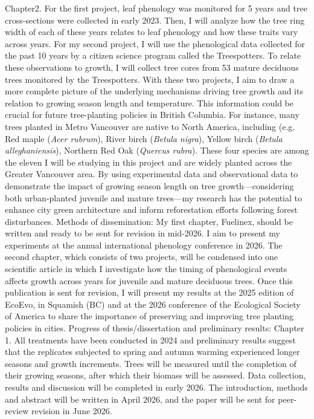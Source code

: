 \documentclass[11pt,letter]{article}
\begin{document}
Chapter2. For the first project, leaf phenology was monitored for 5 years and tree cross-sections  were collected in early 2023. Then, I will analyze how the tree ring width of each of these years relates to leaf phenology and how these traits vary across years. For my second project, I will use the phenological data collected for the past 10 years by a citizen science program called the Treespotters. To relate these observations to growth, I will collect tree cores from 53 mature deciduous trees monitored by the Treespotters. With these two projects, I aim to draw a more complete picture of the underlying mechanisms driving tree growth and its relation to growing season length and temperature. This information could be crucial for future tree-planting policies in British Columbia. For instance, many trees planted in Metro Vancouver are native to North America, including (e.g. Red maple (\textit{Acer rubrum}), River birch (\textit{Betula nigra}), Yellow birch (\textit{Betula alleghaniensis}), Northern Red Oak (\textit{Quercus rubra}). These four species are among the eleven I will be studying in this project and are widely planted across the Greater Vancouver area. By using experimental data and observational data to demonstrate the impact of growing season length on tree growth—considering both urban-planted juvenile and mature trees—my research has the potential to enhance city green architecture and inform reforestation efforts following forest disturbances.
Methods of dissemination: My first chapter, Fuelinex, should be written and ready to be sent for revision in mid-2026. I aim to present my experiments at the annual international phenology conference in 2026. The second chapter, which consists of two projects, will be condensed into one scientific article in which I investigate how the timing of phenological events affects growth across years for juvenile and mature deciduous trees. Once this publication is sent for revision, I will present my results at the 2025 edition of EcoEvo, in Squamish (BC) and at the 2026 conference of the Ecological Society of America to share the importance of preserving and improving tree planting policies in cities.
Progress of thesis/dissertation and preliminary results: 
Chapter 1. All treatments have been conducted in 2024 and preliminary results suggest that the replicates subjected to spring and autumn warming experienced longer seasons and growth increments. Trees will be measured until the completion of their growing seasons, after which their biomass will be assessed. Data collection, results and discussion will be completed in early 2026. The introduction, methods and abstract will be written in April 2026, and the paper will be sent for peer-review revision in June 2026.
\end{document}
